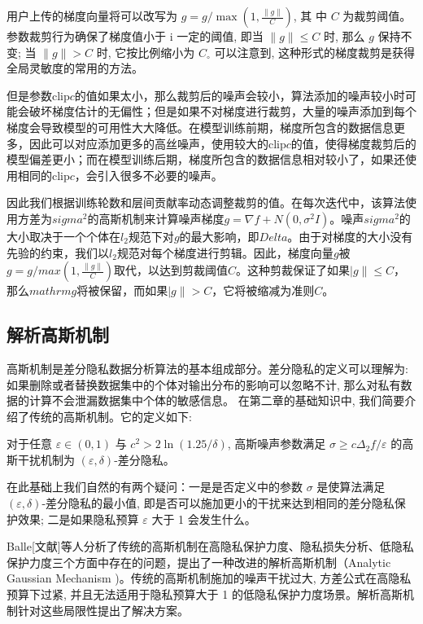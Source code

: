 用户上传的梯度向量将可以改写为 $g=g / \max \left(1, \frac{\|g\|}{C}\right)$, 其 中 $C$ 为裁剪阈值。参数裁剪行为确保了梯度值小于 $\mathrm{i}$ 一定的阈值, 即当 $\|g\| \leq C$ 时, 那么 $g$ 保持不变; 当 $\|g\|>C$ 时, 它按比例缩小为 $C_{\circ}$ 可以注意到, 这种形式的梯度裁剪是获得全局灵敏度的常用的方法。

但是参数clip$c$的值如果太小，那么裁剪后的噪声会较小，算法添加的噪声较小时可能会破坏梯度估计的无偏性；但是如果不对梯度进行裁剪，大量的噪声添加到每个梯度会导致模型的可用性大大降低。在模型训练前期，梯度所包含的数据信息更多，因此可以对应添加更多的高丝噪声，使用较大的clip$c$的值，使得梯度裁剪后的模型偏差更小；而在模型训练后期，梯度所包含的数据信息相对较小了，如果还使用相同的clip$c$，会引入很多不必要的噪声。

因此我们根据训练轮数和层间贡献率动态调整裁剪的值。在每次迭代中，该算法使用方差为$sigma^{2}$的高斯机制来计算噪声梯度$g=\nabla f+N\left(0, \sigma^{2} I\right)$。噪声$sigma^{2}$的大小取决于一个个体在$l_{2}$规范下对$g$的最大影响，即$Delta$。由于对梯度的大小没有先验的约束，我们以$l_{2}$规范对每个梯度进行剪辑。因此，梯度向量$g$被$g=g/max \left(1, \frac{\|g\|}{C}\right)$取代，以达到剪裁阈值$C$。这种剪裁保证了如果$|g\| \leq C$，那么$mathrm{g}$将被保留，而如果$|g\|>C$，它将被缩减为准则$C$。

\subsection{解析高斯机制}
高斯机制是差分隐私数据分析算法的基本组成部分。差分隐私的定义可以理解为: 如果删除或者替换数据集中的个体对输出分布的影响可以忽略不计, 那么对私有数据的计算不会泄漏数据集中个体的敏感信息。
在第二章的基础知识中, 我们简要介绍了传统的高斯机制。它的定义如下: 
\begin{define}\label{差分隐私高斯机制}
对于任意 $\varepsilon \in(0,1)$ 与 $c^{2}>2 \ln (1.25 / \delta)$, 高斯噪声参数满足 $\sigma \geq c \Delta_{2} f / \varepsilon$ 的高斯干扰机制为 $(\varepsilon, \delta)$-差分隐私。
\end{define}

在此基础上我们自然的有两个疑问：一是是否定义中的参数 $\sigma$ 是使算法满足 $(\varepsilon, \delta)$-差分隐私的最小值, 即是否可以施加更小的干扰来达到相同的差分隐私保护效果; 二是如果隐私预算 $\varepsilon$ 大于 1 会发生什么。

Balle[文献]等人分析了传统的高斯机制在高隐私保护力度、隐私损失分析、低隐私保护力度三个方面中存在的问题，提出了一种改进的解析高斯机制（Analytic Gaussian Mechanism )。传统的高斯机制施加的噪声干扰过大, 方差公式在高隐私预算下过紧, 并且无法适用于隐私预算大于 1 的低隐私保护力度场景。解析高斯机制针对这些局限性提出了解决方案。

